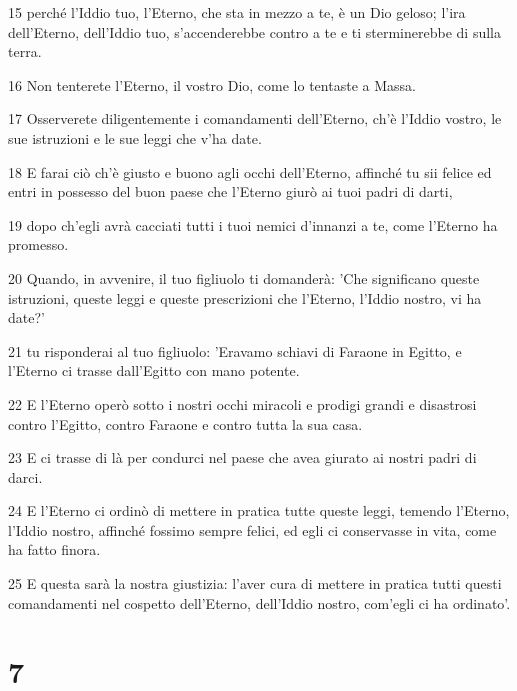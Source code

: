 \par 15 perché l'Iddio tuo, l'Eterno, che sta in mezzo a te, è un Dio geloso; l'ira dell'Eterno, dell'Iddio tuo, s'accenderebbe contro a te e ti sterminerebbe di sulla terra.
\par 16 Non tenterete l'Eterno, il vostro Dio, come lo tentaste a Massa.
\par 17 Osserverete diligentemente i comandamenti dell'Eterno, ch'è l'Iddio vostro, le sue istruzioni e le sue leggi che v'ha date.
\par 18 E farai ciò ch'è giusto e buono agli occhi dell'Eterno, affinché tu sii felice ed entri in possesso del buon paese che l'Eterno giurò ai tuoi padri di darti,
\par 19 dopo ch'egli avrà cacciati tutti i tuoi nemici d'innanzi a te, come l'Eterno ha promesso.
\par 20 Quando, in avvenire, il tuo figliuolo ti domanderà: 'Che significano queste istruzioni, queste leggi e queste prescrizioni che l'Eterno, l'Iddio nostro, vi ha date?'
\par 21 tu risponderai al tuo figliuolo: 'Eravamo schiavi di Faraone in Egitto, e l'Eterno ci trasse dall'Egitto con mano potente.
\par 22 E l'Eterno operò sotto i nostri occhi miracoli e prodigi grandi e disastrosi contro l'Egitto, contro Faraone e contro tutta la sua casa.
\par 23 E ci trasse di là per condurci nel paese che avea giurato ai nostri padri di darci.
\par 24 E l'Eterno ci ordinò di mettere in pratica tutte queste leggi, temendo l'Eterno, l'Iddio nostro, affinché fossimo sempre felici, ed egli ci conservasse in vita, come ha fatto finora.
\par 25 E questa sarà la nostra giustizia: l'aver cura di mettere in pratica tutti questi comandamenti nel cospetto dell'Eterno, dell'Iddio nostro, com'egli ci ha ordinato'.

\chapter{7}

